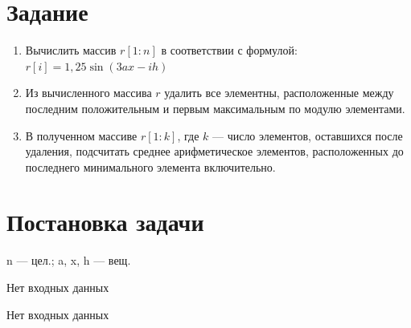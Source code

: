 

\renewcommand{\labnumber}{1}
\renewcommand{\tasks}{(2, 8, 3)}



\maketitle
\thispagestyle{empty}
\newpage
{}
\tableofcontents
\newpage

\section{Задание}

\begin{enumerate}
    \item Вычислить массив $r[1:n]$ в соответствии с формулой:
        $r[i] = 1,25 \sin(3ax -ih)$
    \item Из вычисленного массива $r$ удалить все элементны,
        расположенные между последним положительным и первым
        максимальным по модулю элементами.
    \item В полученном массиве $r[1:k]$, где $k$ --- число
        элементов, оставшихся после удаления, подсчитать среднее
        арифметическое элементов, расположенных до последнего
        минимального элемента включительно.
\end{enumerate}

\newpage
\section{Постановка задачи}

\given
{
    \item n --- цел.; a, x, h --- вещ.
    \item Нет входных данных
    \item Нет входных данных
}



